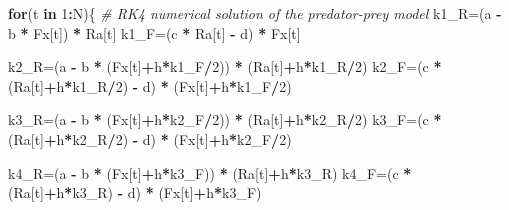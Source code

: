 \documentclass[12pt,]{book}
\newenvironment{Shaded}{\begin{snugshade}}{\end{snugshade}}
\newcommand{\CommentTok}[1]{\textcolor[rgb]{0.56,0.35,0.01}{\textit{#1}}}
\newcommand{\ControlFlowTok}[1]{\textcolor[rgb]{0.13,0.29,0.53}{\textbf{#1}}}
\newcommand{\DecValTok}[1]{\textcolor[rgb]{0.00,0.00,0.81}{#1}}
\newcommand{\NormalTok}[1]{#1}
\newcommand{\OperatorTok}[1]{\textcolor[rgb]{0.81,0.36,0.00}{\textbf{#1}}}
\newcommand{\StringTok}[1]{\textcolor[rgb]{0.31,0.60,0.02}{#1}}
\begin{document}
\begin{Shaded}
\begin{Highlighting}[]
  \ControlFlowTok{for}\NormalTok{(t }\ControlFlowTok{in} \DecValTok{1}\OperatorTok{:}\NormalTok{N)\{}
  \CommentTok{# RK4 numerical solution of the predator-prey model}
\NormalTok{  k1_R=(a }\OperatorTok{-}\StringTok{ }\NormalTok{b }\OperatorTok{*}\StringTok{ }\NormalTok{Fx[t]) }\OperatorTok{*}\StringTok{ }\NormalTok{Ra[t]}
\NormalTok{  k1_F=(c }\OperatorTok{*}\StringTok{ }\NormalTok{Ra[t] }\OperatorTok{-}\StringTok{ }\NormalTok{d) }\OperatorTok{*}\StringTok{ }\NormalTok{Fx[t]}

\NormalTok{  k2_R=(a }\OperatorTok{-}\StringTok{ }\NormalTok{b }\OperatorTok{*}\StringTok{ }\NormalTok{(Fx[t]}\OperatorTok{+}\NormalTok{h}\OperatorTok{*}\NormalTok{k1_F}\OperatorTok{/}\DecValTok{2}\NormalTok{)) }\OperatorTok{*}\StringTok{ }\NormalTok{(Ra[t]}\OperatorTok{+}\NormalTok{h}\OperatorTok{*}\NormalTok{k1_R}\OperatorTok{/}\DecValTok{2}\NormalTok{)}
\NormalTok{  k2_F=(c }\OperatorTok{*}\StringTok{ }\NormalTok{(Ra[t]}\OperatorTok{+}\NormalTok{h}\OperatorTok{*}\NormalTok{k1_R}\OperatorTok{/}\DecValTok{2}\NormalTok{) }\OperatorTok{-}\StringTok{ }\NormalTok{d) }\OperatorTok{*}\StringTok{ }\NormalTok{(Fx[t]}\OperatorTok{+}\NormalTok{h}\OperatorTok{*}\NormalTok{k1_F}\OperatorTok{/}\DecValTok{2}\NormalTok{)}

\NormalTok{  k3_R=(a }\OperatorTok{-}\StringTok{ }\NormalTok{b }\OperatorTok{*}\StringTok{ }\NormalTok{(Fx[t]}\OperatorTok{+}\NormalTok{h}\OperatorTok{*}\NormalTok{k2_F}\OperatorTok{/}\DecValTok{2}\NormalTok{)) }\OperatorTok{*}\StringTok{ }\NormalTok{(Ra[t]}\OperatorTok{+}\NormalTok{h}\OperatorTok{*}\NormalTok{k2_R}\OperatorTok{/}\DecValTok{2}\NormalTok{)}
\NormalTok{  k3_F=(c }\OperatorTok{*}\StringTok{ }\NormalTok{(Ra[t]}\OperatorTok{+}\NormalTok{h}\OperatorTok{*}\NormalTok{k2_R}\OperatorTok{/}\DecValTok{2}\NormalTok{) }\OperatorTok{-}\StringTok{ }\NormalTok{d) }\OperatorTok{*}\StringTok{ }\NormalTok{(Fx[t]}\OperatorTok{+}\NormalTok{h}\OperatorTok{*}\NormalTok{k2_F}\OperatorTok{/}\DecValTok{2}\NormalTok{)}

\NormalTok{  k4_R=(a }\OperatorTok{-}\StringTok{ }\NormalTok{b }\OperatorTok{*}\StringTok{ }\NormalTok{(Fx[t]}\OperatorTok{+}\NormalTok{h}\OperatorTok{*}\NormalTok{k3_F)) }\OperatorTok{*}\StringTok{ }\NormalTok{(Ra[t]}\OperatorTok{+}\NormalTok{h}\OperatorTok{*}\NormalTok{k3_R)}
\NormalTok{  k4_F=(c }\OperatorTok{*}\StringTok{ }\NormalTok{(Ra[t]}\OperatorTok{+}\NormalTok{h}\OperatorTok{*}\NormalTok{k3_R) }\OperatorTok{-}\StringTok{ }\NormalTok{d) }\OperatorTok{*}\StringTok{ }\NormalTok{(Fx[t]}\OperatorTok{+}\NormalTok{h}\OperatorTok{*}\NormalTok{k3_F)}


\end{Highlighting}
\end{Shaded}
\end{document}
